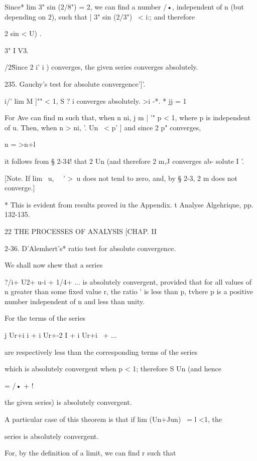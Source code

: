 Since* lim 3" sin (2/8") = 2, we can find a number /•, independent of
n (but depending on 2), such that | 3" sin (2/3") \ < i:; and
therefore

2 sin < U) .



3" I V3.

  /2\" Since 2 i' i ) converges, the given series converges
absolutely.

235. Gauchy's test for absolute convergence']'.

i/' lim M ]"" < 1, S ? i converges absolutely. >i -*. * jj = 1

For Ave can find m such that, when n ni, j m | '" p < 1, where p is
independent of u. Then, when n > ni, '. Un \ < p' ] and since 2 p"
converges,

n = >n+l

it follows from § 2-34! that 2 Un (and therefore 2 m,J converges ab-
solute I '.

[Note. If lim \ u, \ \ ' >\, u does not tend to zero, and, by § 2-3, 2
m does not converge.]

* This is evident from results proved iu the Appendix. t Analyse
Algehrique, pp. 132-135.



22 THE PROCESSES OF ANALYSIS [CHAP. II

2-36. D'Alemhert's* ratio test for absolute convergence.

We shall now shew that a series

?/i+ U2+ u-i + 1/4+ ... is absolutely convergent, provided that for
all values of n greater than some fixed value r, the ratio ' is less
than p, tvhere p is a positive number independent of n and less than
unity.

For the terms of the series

j Ur+i i + i Ur+-2 I + i Ur+i \ + ...

are respectively less than the corresponding terms of the series

which is absolutely convergent when p < 1; therefore S Un (and hence

  = /• + !

the given series) is absolutely convergent.

A particular case of this theorem is that if lim (Un+Jun) \ = l <1,
the

series is absolutely convergent.

For, by the definition of a limit, we can find r such that



